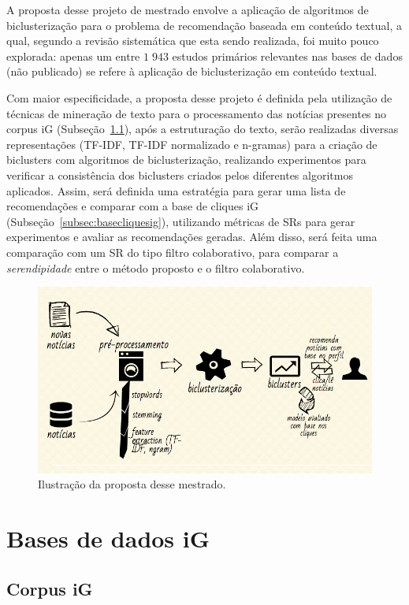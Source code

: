 \documentclass[normaltoc, espacoumemeio, pnumromarab,ruledheader]{abnt}
\begin{document}
A proposta desse projeto de mestrado envolve a aplicação de algoritmos de biclusterização para o problema de recomendação baseada em conteúdo textual, a qual, segundo a revisão sistemática que esta sendo realizada, foi muito pouco explorada: apenas um entre $1\;943$ estudos primários relevantes nas bases de dados (não publicado) se refere à aplicação de biclusterização em conteúdo textual.

Com maior especificidade, a proposta desse projeto é definida pela utilização de técnicas de mineração de texto para o processamento das notícias presentes no corpus iG (Subseção~\ref{subsec:corpusig}), após a estruturação do texto, serão realizadas diversas representações (TF-IDF, TF-IDF normalizado e n-gramas) para a criação de biclusters com algoritmos de biclusterização, realizando experimentos para verificar a consistência dos biclusters criados pelos diferentes algoritmos aplicados.
Assim, será definida uma estratégia para gerar uma lista de recomendações e comparar com a base de cliques iG (Subseção~\ref{subsec:basecliquesig}), utilizando métricas de SRs para gerar experimentos e avaliar as recomendações geradas. Além disso, será feita uma comparação com um SR do tipo filtro colaborativo, para comparar a \textit{serendipidade} entre o método proposto e o filtro colaborativo.

\begin{figure}[h]
\centering
\includegraphics[width=120mm]{img/proposal.png}
\caption{Ilustração da proposta desse mestrado.}
\label{fig:story}
\end{figure}

\section{Bases de dados iG}
\label{sec:basesig}

\subsection{Corpus iG}
\label{subsec:corpusig}
\end{document}
